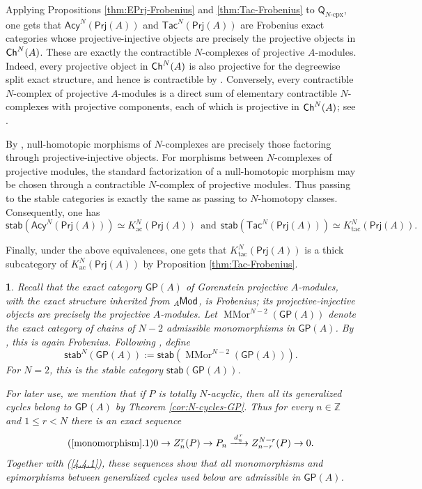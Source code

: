 \documentclass{amsart}
\theoremstyle{bfupright head,slanted body}
\theoremstyle{bfupright head,upright body}
\theoremstyle{fixed bf head,slanted body}
\theoremstyle{fixed bf head,upright body}
\theoremstyle{numbered paragraph}
\newtheorem{ipg}[res]{}
\newenvironment{prf*}[1][Proof]{%
	\begin{proof}[\bf #1]
		\setcounter{equation}{0}
		\renewcommand{\theequation}{\arabic{equation}}}
	{\end{proof}
}
\numberwithin{equation}{res}
\newcommand{\GP}[1]{\mathsf{GP}(#1)}
\newcommand{\Prj}[1]{\mathsf{Prj}(#1)}
\newcommand{\xra}[2][]{\xrightarrow[#1]{\:#2\:}}
\newcommand{\Q}{\mathsf{Q}}
\newcommand{\lMod}[1]{{}_{#1}\mspace{-1mu}{\sf{Mod}}}
\begin{document}
\begin{prf*}
Applying Propositions \ref{thm:EPrj-Frobenius} and \ref{thm:Tac-Frobenius} to $\Q_{N\text{-}\mathrm{cpx}}$, one gets that $\mathsf{Acy}^N(\Prj A)$ and $\mathsf{Tac}^N(\Prj A)$ are Frobenius exact categories whose projective-injective objects are precisely the projective objects in ${\sf Ch}^N(A)$. These are exactly the contractible $N$-complexes of projective $A$-modules. Indeed, every projective object in ${\sf Ch}^N(A)$ is also projective for the degreewise split exact structure, and hence is contractible by \cite[Theorem 2.1]{IKM17}. Conversely, every contractible $N$-complex of projective $A$-modules is a direct sum of elementary contractible $N$-complexes with projective components, each of which is projective in ${\sf Ch}^N(A)$; see \cite[Theorem 2.1]{IKM17}.

By \cite[Theorem 2.6]{IKM17}, null-homotopic morphisms of $N$-complexes are precisely those factoring through projective-injective objects. For morphisms between $N$-complexes of projective modules, the standard factorization of a null-homotopic morphism may be chosen through a contractible $N$-complex of projective modules. Thus passing to the stable categories is exactly the same as passing to $N$-homotopy classes. Consequently, one has
$$\mathsf{stab}(\mathsf{Acy}^N(\Prj A))
\simeq K^N_{\mathrm{ac}}(\Prj A)
\ \ \text{and}\ \
\mathsf{stab}(\mathsf{Tac}^N(\Prj A))
\simeq K^N_{\mathrm{tac}}(\Prj A).$$

Finally, under the above equivalences, one gets that $K^N_{\mathrm{tac}}(\Prj A)$ is a thick subcategory of $K^N_{\mathrm{ac}}(\Prj A)$ by Proposition \ref{thm:Tac-Frobenius}.
\end{prf*}

\begin{ipg}\label{monomorphism}
Recall that the exact category $\GP{A}$ of Gorenstein projective $A$-modules, with the exact structure inherited from $\lMod{A}$, is Frobenius; its projective-injective objects are precisely the projective $A$-modules. Let $\operatorname{MMor}^{N-2}(\GP{A})$ denote the exact category of chains of $N-2$ admissible monomorphisms in $\GP{A}$. By \cite[Theorem 3.12]{BM24}, this is again Frobenius. Following \cite[Definition 3.13]{BM24}, define
$$\mathsf{stab}^N(\GP{A}):=\mathsf{stab}(\operatorname{MMor}^{N-2}(\GP{A})).$$
For $N=2$, this is the stable category $\mathsf{stab}(\GP{A})$.

For later use, we mention that if $P$ is totally $N$-acyclic, then all its generalized cycles belong to $\GP A$ by Theorem \ref{cor:N-cycles-GP}. Thus for every $n\in\mathbb Z$ and $1\leq r<N$ there is an exact sequence
\begin{equation}\tag{\ref{monomorphism}.1}\label{4.7.1}
0\to Z_n^r(P)\to P_n\xra{d_n^{\,r}}Z_{n-r}^{N-r}(P)\to 0.
\end{equation}
Together with (\ref{4.4.1}), these sequences show that all monomorphisms and epimorphisms between generalized cycles used below are admissible in $\GP A$.
\end{ipg}
\end{document}
